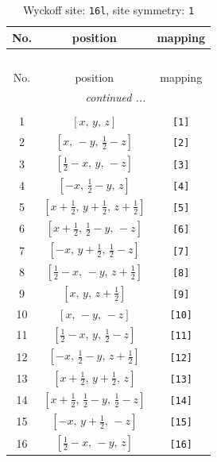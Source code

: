 \documentclass[fleqn,8pt]{jsarticle}
\begin{document}
\begin{longtable}{ccc}
\caption{Wyckoff site: {\tt 16l}, site symmetry: {\tt 1}}
 \\
 \hline \hline
No. & position & mapping \\ \hline \endfirsthead

\multicolumn{2}{l}{\tablename\ \thetable{}} \\
 \hline \hline
No. & position & mapping \\ \hline \endhead

 \hline \hline
\multicolumn{2}{r}{\footnotesize\it continued ...} \\ \endfoot

 \hline \hline
\multicolumn{2}{r}{} \\ \endlastfoot

1 & $\left[ x,\, y,\, z \right]$ & {\tt [1]} \\ \hline
2 & $\left[ x,\, - y,\, \frac{1}{2} - z \right]$ & {\tt [2]} \\ \hline
3 & $\left[ \frac{1}{2} - x,\, y,\, - z \right]$ & {\tt [3]} \\ \hline
4 & $\left[ - x,\, \frac{1}{2} - y,\, z \right]$ & {\tt [4]} \\ \hline
5 & $\left[ x + \frac{1}{2},\, y + \frac{1}{2},\, z + \frac{1}{2} \right]$ & {\tt [5]} \\ \hline
6 & $\left[ x + \frac{1}{2},\, \frac{1}{2} - y,\, - z \right]$ & {\tt [6]} \\ \hline
7 & $\left[ - x,\, y + \frac{1}{2},\, \frac{1}{2} - z \right]$ & {\tt [7]} \\ \hline
8 & $\left[ \frac{1}{2} - x,\, - y,\, z + \frac{1}{2} \right]$ & {\tt [8]} \\ \hline
9 & $\left[ x,\, y,\, z + \frac{1}{2} \right]$ & {\tt [9]} \\ \hline
10 & $\left[ x,\, - y,\, - z \right]$ & {\tt [10]} \\ \hline
11 & $\left[ \frac{1}{2} - x,\, y,\, \frac{1}{2} - z \right]$ & {\tt [11]} \\ \hline
12 & $\left[ - x,\, \frac{1}{2} - y,\, z + \frac{1}{2} \right]$ & {\tt [12]} \\ \hline
13 & $\left[ x + \frac{1}{2},\, y + \frac{1}{2},\, z \right]$ & {\tt [13]} \\ \hline
14 & $\left[ x + \frac{1}{2},\, \frac{1}{2} - y,\, \frac{1}{2} - z \right]$ & {\tt [14]} \\ \hline
15 & $\left[ - x,\, y + \frac{1}{2},\, - z \right]$ & {\tt [15]} \\ \hline
16 & $\left[ \frac{1}{2} - x,\, - y,\, z \right]$ & {\tt [16]} \\
\end{longtable}
\end{document}
